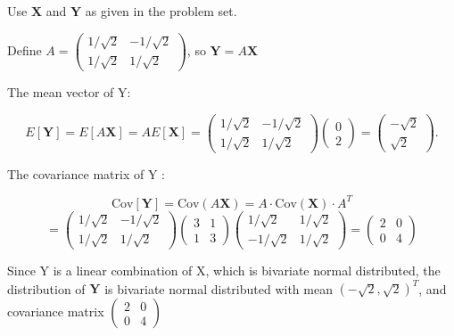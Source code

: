 Use $\textbf{X}$ and $\textbf{Y}$ as given in the problem set.


Define $A =  \begin{pmatrix}
1/ \sqrt{2} & - 1/ \sqrt{2} \\
1/ \sqrt{2}  & 1/ \sqrt{2} 
\end{pmatrix}$, so $\textbf{Y} = A\textbf{X}$

The mean vector of Y:

$$E[\textbf{Y}] = E[A \textbf{X}] = A E[\textbf{X}] = \begin{pmatrix}
1/ \sqrt{2} & - 1/ \sqrt{2} \\
1/ \sqrt{2}  & 1/ \sqrt{2} 
\end{pmatrix} \begin{pmatrix}
0 \\
2  
\end{pmatrix} = \begin{pmatrix}
- \sqrt{2}\\
\sqrt{2}  
\end{pmatrix} .$$


The covariance matrix of Y : 

$$\text{Cov}[\textbf{Y}] = \text{Cov}(A\textbf{X}) = A \cdot \text{Cov}(\textbf{X}) \cdot A^T $$ $$= \begin{pmatrix}
1/ \sqrt{2} & - 1/ \sqrt{2} \\
1/ \sqrt{2}  & 1/ \sqrt{2} 
\end{pmatrix} \begin{pmatrix}
3 & 1 \\
1  & 3
\end{pmatrix} \begin{pmatrix}
1/ \sqrt{2} &  1/ \sqrt{2} \\
- 1/ \sqrt{2}  & 1/ \sqrt{2} 
\end{pmatrix} = \begin{pmatrix}
2 & 0\\
0  & 4 
\end{pmatrix} $$


Since Y is a linear combination of X, which is bivariate normal distributed, the distribution of $\textbf{Y}$ is bivariate normal distributed with mean $(-\sqrt{2}, \sqrt{2})^T$, and covariance matrix $\begin{pmatrix}
2 & 0\\
0  & 4 
\end{pmatrix} $

